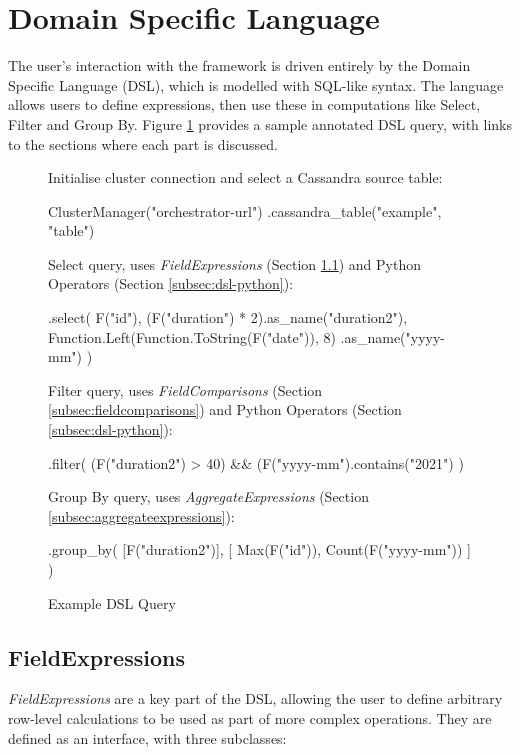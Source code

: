 \section{Domain Specific Language}
The user's interaction with the framework is driven entirely by the Domain Specific Language (DSL), which is modelled with SQL-like syntax. The language allows users to define expressions, then use these in computations like Select, Filter and Group By. Figure \ref{fig:dsl-high-level-example} provides a sample annotated DSL query, with links to the sections where each part is discussed.

\begin{figure}[ht]
	Initialise cluster connection and select a Cassandra source table:
	\begin{python}
ClusterManager("orchestrator-url")
  .cassandra_table("example", "table")
	\end{python}
	
	Select query, uses \textit{FieldExpressions} (Section \ref{subsec:fieldexpressions}) and Python Operators (Section \ref{subsec:dsl-python}):
	\begin{python}
  .select(
    F("id"),
    (F("duration") * 2).as_name("duration2"),
    Function.Left(Function.ToString(F("date")), 8)
      .as_name("yyyy-mm")
  )
	\end{python}

	Filter query, uses \textit{FieldComparisons} (Section \ref{subsec:fieldcomparisons}) and Python Operators (Section \ref{subsec:dsl-python}):
	\begin{python}
  .filter(
    (F("duration2") > 40) && 
  	(F("yyyy-mm").contains("2021")
  )
	\end{python}

	Group By query, uses \textit{AggregateExpressions} (Section \ref{subsec:aggregateexpressions}):
	\begin{python}
  .group_by(
    [F("duration2")],
    [
      Max(F("id")),
      Count(F("yyyy-mm"))
    ]
  )
	\end{python}
	\caption{Example DSL Query}
	\label{fig:dsl-high-level-example}
\end{figure}


\subsection{FieldExpressions}\label{subsec:fieldexpressions}
\textit{FieldExpressions} are a key part of the DSL, allowing the user to define arbitrary row-level calculations to be used as part of more complex operations. They are defined as an interface, with three subclasses:

